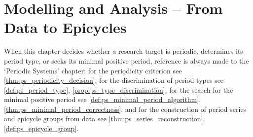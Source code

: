 \chapter{Modelling and Analysis -- From Data to Epicycles}
\label{chap:modelling-analysis}

\begin{remark}\label{rem:modelling_ps_hook}
When this chapter decides whether a research target is periodic, determines its period type, or seeks its minimal positive period, reference is always made to the `Periodic Systems' chapter:
for the periodicity criterion see \cref{thm:ps_periodicity_decision},
for the discrimination of period types see \cref{def:ps_period_type}, \cref{prop:ps_type_discrimination},
for the search for the minimal positive period see \cref{def:ps_minimal_period_algorithm}, \cref{thm:ps_minimal_period_correctness},
and for the construction of period series and epicycle groups from data see \cref{thm:ps_series_reconstruction}, \cref{def:ps_epicycle_group}.
\end{remark}

